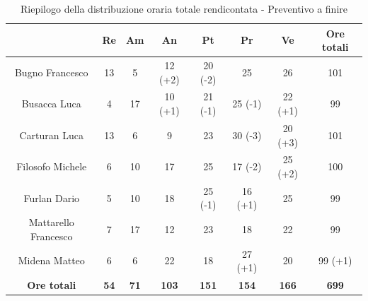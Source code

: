 \begin{table}[H]
  \centering
  \renewcommand{\arraystretch}{1.8}
  \begin{tabular}{c|c|c|c|c|c|c|c}
    \rowcolor[HTML]{125E28}
    \multicolumn{1}{c}{\color[HTML]{FFFFFF}\textbf{ Nominativo }}
                         & \multicolumn{1}{c}{\color[HTML]{FFFFFF}\textbf{ Re }}
                         & \multicolumn{1}{c}{\color[HTML]{FFFFFF}\textbf{ Am}}
                         & \multicolumn{1}{c}{\color[HTML]{FFFFFF}\textbf{ An }}
                         & \multicolumn{1}{c}{\color[HTML]{FFFFFF}\textbf{ Pt }}
                         & \multicolumn{1}{c}{\color[HTML]{FFFFFF}\textbf{ Pr }}
                         & \multicolumn{1}{c}{\color[HTML]{FFFFFF}\textbf{ Ve }}
                         & \multicolumn{1}{c}{\color[HTML]{FFFFFF}\textbf{ Ore totali }}                                                                                          \\
    \hline
    Bugno Francesco      & 13                                                            & 5           & 12 (+2)      & 20 (-2)      & 25           & 26           & 101          \\
    Busacca Luca         & 4                                                             & 17          & 10 (+1)      & 21 (-1)      & 25 (-1)      & 22 (+1)      & 99           \\
    Carturan Luca        & 13                                                            & 6           & 9            & 23           & 30 (-3)      & 20 (+3)      & 101          \\
    Filosofo Michele     & 6                                                             & 10          & 17           & 25           & 17 (-2)      & 25 (+2)      & 100          \\
    Furlan Dario         & 5                                                             & 10          & 18           & 25 (-1)      & 16 (+1)      & 25           & 99           \\
    Mattarello Francesco & 7                                                             & 17          & 12           & 23           & 18           & 22           & 99           \\
    Midena Matteo        & 6                                                             & 6           & 22           & 18           & 27 (+1)      & 20           & 99 (+1)      \\
    \textbf{Ore totali}  & \textbf{54}                                                   & \textbf{71} & \textbf{103} & \textbf{151} & \textbf{154} & \textbf{166} & \textbf{699}
  \end{tabular}
  \caption{Riepilogo della distribuzione oraria totale rendicontata - Preventivo a finire}
\end{table}

